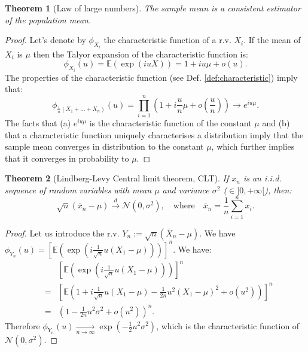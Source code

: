 \documentclass[
  12pt,
]{book}
\newtheorem{theorem}{Theorem}[chapter]
\theoremstyle{definition}
\theoremstyle{definition}
\theoremstyle{definition}
\theoremstyle{definition}
\theoremstyle{remark}
\begin{document}
\begin{theorem}[Law of large numbers]
\protect\hypertarget{thm:LLNappendix}{}\label{thm:LLNappendix}The sample mean is a consistent estimator of the population mean.
\end{theorem}

\begin{proof}
Let's denote by \(\phi_{X_i}\) the characteristic function of a r.v. \(X_i\). If the mean of \(X_i\) is \(\mu\) then the Talyor expansion of the characteristic function is:
\[
\phi_{X_i}(u) = \mathbb{E}(\exp(iuX)) = 1 + iu\mu + o(u).
\]
The properties of the characteristic function (see Def. \ref{def:characteristic}) imply that:
\[
\phi_{\frac{1}{n}(X_1+\dots+X_n)}(u) = \prod_{i=1}^{n} \left(1 + i\frac{u}{n}\mu + o\left(\frac{u}{n}\right) \right) \rightarrow e^{iu\mu}.
\]
The facts that (a) \(e^{iu\mu}\) is the characteristic function of the constant \(\mu\) and (b) that a characteristic function uniquely characterises a distribution imply that the sample mean converges in distribution to the constant \(\mu\), which further implies that it converges in probability to \(\mu\).
\end{proof}

\begin{theorem}[Lindberg-Levy Central limit theorem, CLT]
\protect\hypertarget{thm:LindbergLevyCLT}{}\label{thm:LindbergLevyCLT}If \(x_n\) is an i.i.d. sequence of random variables with mean \(\mu\) and variance \(\sigma^2\) (\(\in ]0,+\infty[\)), then:
\[
\boxed{\sqrt{n} (\bar{x}_n - \mu) \overset{d}{\rightarrow} \mathcal{N}(0,\sigma^2), \quad \mbox{where} \quad \bar{x}_n = \frac{1}{n} \sum_{i=1}^{n} x_i.}
\]
\end{theorem}

\begin{proof}
Let us introduce the r.v. \(Y_n:= \sqrt{n}(\bar{X}_n - \mu)\). We have \(\phi_{Y_n}(u) = \left[ \mathbb{E}\left( \exp(i \frac{1}{\sqrt{n}} u (X_1 - \mu)) \right) \right]^n\). We have:
\begin{eqnarray*}
&&\left[ \mathbb{E}\left( \exp\left(i \frac{1}{\sqrt{n}} u (X_1 - \mu)\right) \right) \right]^n\\
&=& \left[ \mathbb{E}\left( 1 + i \frac{1}{\sqrt{n}} u (X_1 - \mu) - \frac{1}{2n} u^2 (X_1 - \mu)^2 + o(u^2) \right) \right]^n \\
&=& \left( 1 - \frac{1}{2n}u^2\sigma^2 + o(u^2)\right)^n.
\end{eqnarray*}
Therefore \(\phi_{Y_n}(u) \underset{n \rightarrow \infty}{\rightarrow} \exp \left( - \frac{1}{2}u^2\sigma^2 \right)\), which is the characteristic function of \(\mathcal{N}(0,\sigma^2)\).
\end{proof}
\end{document}
